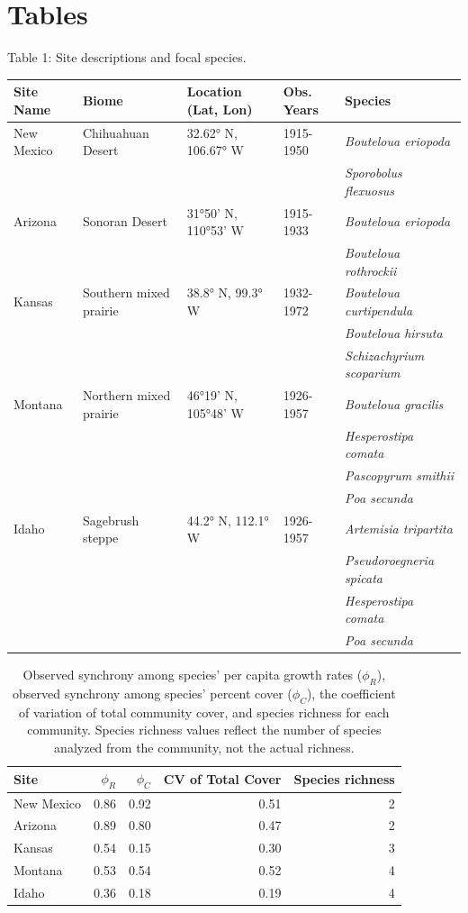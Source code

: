 \documentclass[11pt,]{article}
\begin{document}
\setlength{\parindent}{0ex} \newpage{}

\section{Tables}

\singlespacing

Table 1: Site descriptions and focal species. \footnotesize

\begin{longtable}[c]{@{}lllll@{}}
\toprule
Site Name & Biome & Location (Lat, Lon) & Obs. Years &
Species\tabularnewline
\midrule
\endhead
New Mexico & Chihuahuan Desert & 32.62° N, 106.67° W & 1915-1950 &
\emph{Bouteloua eriopoda}\tabularnewline
& & & & \emph{Sporobolus flexuosus}\tabularnewline
Arizona & Sonoran Desert & 31°50' N, 110°53' W & 1915-1933 &
\emph{Bouteloua eriopoda}\tabularnewline
& & & & \emph{Bouteloua rothrockii}\tabularnewline
Kansas & Southern mixed prairie & 38.8° N, 99.3° W & 1932-1972 &
\emph{Bouteloua curtipendula}\tabularnewline
& & & & \emph{Bouteloua hirsuta}\tabularnewline
& & & & \emph{Schizachyrium scoparium}\tabularnewline
Montana & Northern mixed prairie & 46°19' N, 105°48' W & 1926-1957 &
\emph{Bouteloua gracilis}\tabularnewline
& & & & \emph{Hesperostipa comata}\tabularnewline
& & & & \emph{Pascopyrum smithii}\tabularnewline
& & & & \emph{Poa secunda}\tabularnewline
Idaho & Sagebrush steppe & 44.2° N, 112.1° W & 1926-1957 &
\emph{Artemisia tripartita}\tabularnewline
& & & & \emph{Pseudoroegneria spicata}\tabularnewline
& & & & \emph{Hesperostipa comata}\tabularnewline
& & & & \emph{Poa secunda}\tabularnewline
\bottomrule
\end{longtable}

\normalsize

\pagebreak{}

\begin{table}[ht]
\centering
\caption{Observed synchrony among species' per capita growth rates ($\phi_{R}$), observed synchrony among species' percent cover ($\phi_{C}$), the coefficient of variation of total community cover, and species richness for each community. Species richness values reflect the number of species analyzed from the community, not the actual richness.} 
\begingroup\normalsize
\begin{tabular}{lrrrr}
  \hline
Site & $\phi_{R}$ & $\phi_{C}$ & CV of Total Cover & Species richness \\ 
  \hline
New Mexico & 0.86 & 0.92 & 0.51 &   2 \\ 
  Arizona & 0.89 & 0.80 & 0.47 &   2 \\ 
  Kansas & 0.54 & 0.15 & 0.30 &   3 \\ 
  Montana & 0.53 & 0.54 & 0.52 &   4 \\ 
  Idaho & 0.36 & 0.18 & 0.19 &   4 \\ 
   \hline
\end{tabular}
\endgroup
\end{table}
\end{document}
